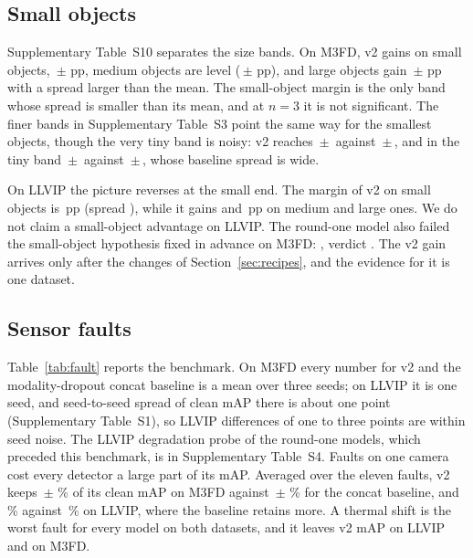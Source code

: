 \subsection{Small objects}
\label{sec:small}
Supplementary Table~S10 separates the size bands. On M3FD, v2 gains on small objects, \marMfdVtwoVsConcatMdMeanApSmall{}\,$\pm$\,\marMfdVtwoVsConcatMdStdApSmall{}\,pp, medium objects are level (\marMfdVtwoVsConcatMdMeanApMedium{}\,$\pm$\,\marMfdVtwoVsConcatMdStdApMedium{}\,pp), and large objects gain \marMfdVtwoVsConcatMdMeanApLarge{}\,$\pm$\,\marMfdVtwoVsConcatMdStdApLarge{}\,pp with a spread larger than the mean. The small-object margin is the only band whose spread is smaller than its mean, and at $n=3$ it is not significant. The finer bands in Supplementary Table~S3 point the same way for the smallest objects, though the very tiny band is noisy: v2 reaches \resMfdCffmVtwoMeanApBandVeryTiny{}\,$\pm$\,\resMfdCffmVtwoStdApBandVeryTiny{} against \resMfdConcatMdMeanApBandVeryTiny{}\,$\pm$\,\resMfdConcatMdStdApBandVeryTiny{}, and in the tiny band \resMfdCffmVtwoMeanApBandTiny{}\,$\pm$\,\resMfdCffmVtwoStdApBandTiny{} against \resMfdConcatMdMeanApBandTiny{}\,$\pm$\,\resMfdConcatMdStdApBandTiny{}, whose baseline spread is wide.

On LLVIP the picture reverses at the small end. The margin of v2 on small objects is \marLlvipVtwoVsConcatMdMeanApSmall{}\,pp (spread \marLlvipVtwoVsConcatMdStdApSmall{}), while it gains \marLlvipVtwoVsConcatMdMeanApMedium{} and \marLlvipVtwoVsConcatMdMeanApLarge{}\,pp on medium and large ones. We do not claim a small-object advantage on LLVIP. The round-one model also failed the small-object hypothesis fixed in advance on M3FD: \hypPhThreeEvidence{}, verdict \hypPhThreeVerdict{}. The v2 gain arrives only after the changes of Section~\ref{sec:recipes}, and the evidence for it is one dataset.

\subsection{Sensor faults}
\label{sec:faults}
Table~\ref{tab:fault} reports the benchmark. On M3FD every number for v2 and the modality-dropout concat baseline is a mean over three seeds; on LLVIP it is one seed, and seed-to-seed spread of clean mAP there is about one point (Supplementary Table~S1), so LLVIP differences of one to three points are within seed noise. The LLVIP degradation probe of the round-one models, which preceded this benchmark, is in Supplementary Table~S4. Faults on one camera cost every detector a large part of its mAP. Averaged over the eleven faults, v2 keeps \fltMfdCffmVtwoMeanRetainedSevThreePercent{}\,$\pm$\,\fltMfdCffmVtwoStdRetainedSevThreePercent{}\,\% of its clean mAP on M3FD against \fltMfdConcatMdMeanRetainedSevThreePercent{}\,$\pm$\,\fltMfdConcatMdStdRetainedSevThreePercent{}\,\% for the concat baseline, and \fltLlvipCffmVtwoRetainedSevThreePercent{}\,\% against \fltLlvipConcatMdRetainedSevThreePercent{}\,\% on LLVIP, where the baseline retains more. A thermal shift is the worst fault for every model on both datasets, and it leaves v2 \fltLlvipCffmVtwoWorstSevThreeMap{} mAP on LLVIP and \fltMfdCffmVtwoWorstSevThreeMap{} on M3FD.

